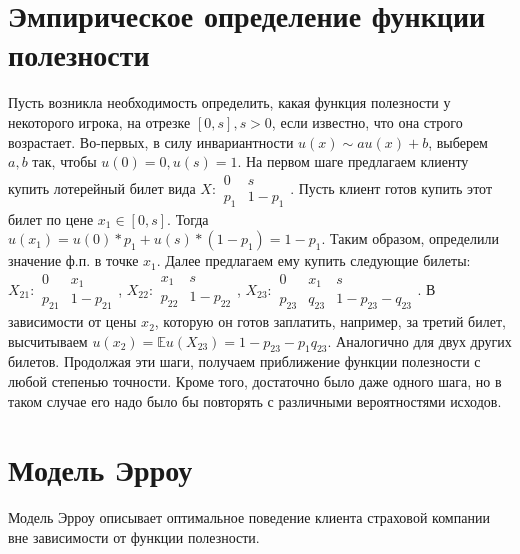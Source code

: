 \documentclass{article}
\theoremstyle{definition}
\begin{document}
\section{Эмпирическое определение функции полезности}
Пусть возникла необходимость определить, какая функция полезности у некоторого игрока, на отрезке $[0, s], s > 0$, если известно, что она строго возрастает. Во-первых, в силу инвариантности $u(x) \sim au(x) + b$, выберем $a, b$ так, чтобы $u(0) = 0, u(s) = 1$. На первом шаге предлагаем клиенту купить лотерейный билет вида $X: \begin{smallmatrix}
0 & s \\
p_1 & 1 - p_1
\end{smallmatrix}$. Пусть клиент готов купить этот билет по цене $x_1 \in [0, s]$. Тогда $u(x_1) = u(0) * p_1 + u(s) * (1 - p_1) = 1 - p_1$. Таким образом, определили значение ф.п. в точке $x_1$. Далее предлагаем ему купить следующие билеты: $X_{21}: \begin{smallmatrix}
0 & x_1 \\
p_{21} & 1 - p_{21}
\end{smallmatrix}$, $X_{22}: \begin{smallmatrix}
x_1 & s \\
p_{22} & 1 - p_{22}
\end{smallmatrix}$, $X_{23}: \begin{smallmatrix}
0 & x_1 & s \\
p_{23} & q_{23} & 1 - p_{23} - q_{23}
\end{smallmatrix}$. В зависимости от цены $x_2$, которую он готов заплатить, например, за третий билет, высчитываем $u(x_2) = \mathbb{E}u(X_{23}) = 1 - p_{23} - p_1q_{23}$. Аналогично для двух других билетов. Продолжая эти шаги, получаем приближение функции полезности с любой степенью точности. Кроме того, достаточно было даже одного шага, но в таком случае его надо было бы повторять с различными вероятностями исходов.

\section{Модель Эрроу}
Модель Эрроу описывает оптимальное поведение клиента страховой компании вне зависимости от функции полезности.
\end{document}

